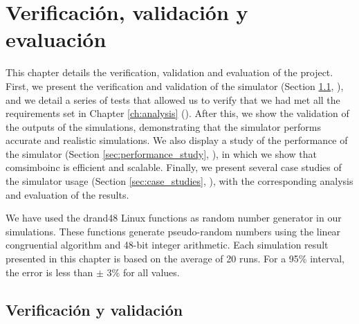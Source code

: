 \chead[]{}
\renewcommand{\headrulewidth}{0.5pt}

\lfoot[]{}
\cfoot[]{}
\rfoot[]{}
\renewcommand{\footrulewidth}{0pt}

\chapter{Verificación, validación y evaluación}
\label{ch:verification_validation_and_evaluation}

This chapter details the verification, validation and evaluation of the project. First, we present the verification and validation of the simulator (Section \ref{sec:verification_and_validation}, \textit{}), and we detail a series of tests that allowed us to verify that we had met all the requirements set in Chapter \ref{ch:analysis} (\textit{}). After this, we show the validation of the outputs of the simulations, demonstrating that the simulator performs accurate and realistic simulations. We also display a study of the performance of the simulator (Section \ref{sec:performance_study}, \textit{}), in which we show that \gls{comsimboinc} is efficient and scalable. Finally, we present several case studies of the simulator usage (Section \ref{sec:case_studies}, \textit{}), with the corresponding analysis and evaluation of the results.

We have used the drand48 Linux functions \cite{drand48} as random number generator in our simulations. These functions generate pseudo-random numbers using the linear congruential algorithm and 48-bit integer arithmetic. Each simulation result presented in this chapter is based on the average of 20 runs. For a 95\% interval, the error is less than $\pm$ 3\% for all values.

\section{Verificación y validación}
\label{sec:verification_and_validation}

